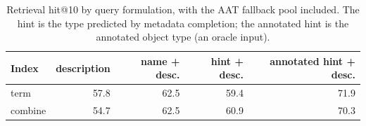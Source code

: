 \begin{table}[t]
\centering
\small
\begin{tabular}{lrrrr}
\toprule
Index & description & name + desc. & hint + desc. & annotated hint + desc. \\
\midrule
term & 57.8 & 62.5 & 59.4 & 71.9 \\
combine & 54.7 & 62.5 & 60.9 & 70.3 \\
\bottomrule
\end{tabular}
\caption{Retrieval hit@10 by query formulation, with the AAT fallback pool included. The hint is the type predicted by metadata completion; the annotated hint is the annotated object type (an oracle input).}
\label{tab:queries}
\end{table}
